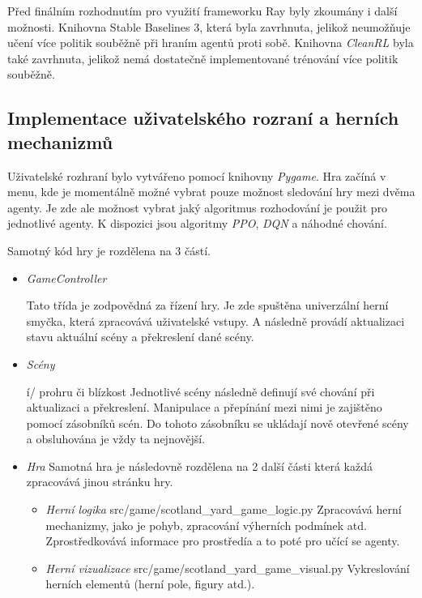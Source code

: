 Před finálním rozhodnutím pro využití frameworku Ray byly zkoumány i další možnosti.
Knihovna Stable Baselines 3, která byla zavrhnuta, jelikož neumožňuje učení více politik souběžně při hraním agentů proti sobě.
Knihovna \textit{CleanRL} byla také zavrhnuta, jelikož nemá dostatečně implementované trénování více politik souběžně.

\subsection{Implementace uživatelského rozraní a herních mechanizmů}\label{subsec:implementace-uzivatelskeho-rozrani-a-hernich-mechanizmu}

Uživatelské rozhraní bylo vytvářeno pomocí knihovny \emph{Pygame}.
Hra začíná v menu, kde je momentálně možné vybrat pouze možnost sledování hry mezi dvěma agenty.
Je zde ale možnost vybrat jaký algoritmus rozhodování je použit pro jednotlivé agenty.
K dispozici jsou algoritmy \emph{PPO}, \emph{DQN} a náhodné chování.

Samotný kód hry je rozdělena na 3 částí.

\begin{itemize}
  \item \emph{GameController}~\cite{GameSceneController}
  
  Tato třída je zodpovědná za řízení hry.
  Je zde spuštěna univerzální herní smyčka, která zpracovává uživatelské vstupy.
  A následně provádí aktualizaci stavu aktuální scény a překreslení dané scény.
  \item \emph{Scény}~\cite{GameSceneController}
  
  í/ prohru či blízkost  Jednotlivé scény následně definují své chování při aktualizaci a překreslení.
  Manipulace a přepínání mezi nimi je zajištěno pomocí zásobníků scén.
  Do tohoto zásobníku se ukládají nově otevřené scény a obsluhována je vždy ta nejnovější.

  \item \emph{Hra}
    Samotná hra je následovně rozdělena na 2 další části která každá zpracovává jinou stránku hry.
    \begin{itemize}
      \item \emph{Herní logika} src/game/scotland\_yard\_game\_logic.py
      Zpracovává herní mechanizmy, jako je pohyb, zpracování výherních podmínek atd.
      Zprostředkovává informace pro prostředía a to poté pro učící se agenty.

      \item \emph{Herní vizualizace}  src/game/scotland\_yard\_game\_visual.py
      Vykreslování herních elementů (herní pole, figury atd.).
    \end{itemize}
\end{itemize}

